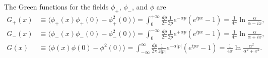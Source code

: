\documentclass{SciPost}
\begin{document}
The Green functions for the fields $\phi_+$, $\phi_-$, and $\phi$ are
\begin{equation*}
\begin{aligned}
	G_+(x) &\equiv \langle \phi_+(x)\phi_+(0)-\phi_+^2(0) \rangle 
	= \int_0^{+\infty} \frac{dp}{2\pi}\frac{1}{2p}e^{-\alpha p} \left(e^{ipx}-1\right)
	= \frac{1}{4\pi} \ln\frac{\alpha}{\alpha-ix}, \\
	G_-(x) &\equiv \langle \phi_-(x)\phi_-(0)-\phi_-^2(0) \rangle 
	= \int_0^{-\infty} \frac{dp}{2\pi}\frac{1}{2p}e^{+\alpha p} \left(e^{ipx}-1\right)
	= \frac{1}{4\pi} \ln\frac{\alpha}{\alpha+ix}, \\
	G(x) &\equiv \langle\phi(x)\phi(0)-\phi^2(0)\rangle 
	= \int_{-\infty}^{\infty} \frac{dp}{2\pi}\frac{1}{2|p|}e^{-\alpha |p|} \left(e^{ipx}-1\right)
	= \frac{1}{4\pi} \ln\frac{\alpha^2}{\alpha^2+x^2}.
\end{aligned}
\end{equation*}
\end{document}
